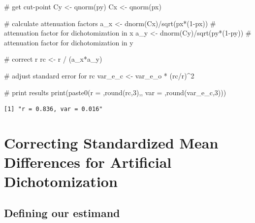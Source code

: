 \documentclass[
  letterpaper,
  DIV=11,
  numbers=noendperiod]{scrreprt}
\newenvironment{Shaded}{\begin{snugshade}}{\end{snugshade}}
\newcommand{\CommentTok}[1]{\textcolor[rgb]{0.37,0.37,0.37}{#1}}
\newcommand{\DecValTok}[1]{\textcolor[rgb]{0.68,0.00,0.00}{#1}}
\newcommand{\FunctionTok}[1]{\textcolor[rgb]{0.28,0.35,0.67}{#1}}
\newcommand{\NormalTok}[1]{\textcolor[rgb]{0.00,0.23,0.31}{#1}}
\newcommand{\OtherTok}[1]{\textcolor[rgb]{0.00,0.23,0.31}{#1}}
\newcommand{\SpecialCharTok}[1]{\textcolor[rgb]{0.37,0.37,0.37}{#1}}
\newcommand{\StringTok}[1]{\textcolor[rgb]{0.13,0.47,0.30}{#1}}
\begin{document}
\begin{Shaded}
\begin{Highlighting}[]
\CommentTok{\# get cut{-}point}
\NormalTok{Cy }\OtherTok{\textless{}{-}} \FunctionTok{qnorm}\NormalTok{(py)}
\NormalTok{Cx }\OtherTok{\textless{}{-}} \FunctionTok{qnorm}\NormalTok{(px)}

\CommentTok{\# calculate attenuation factors}
\NormalTok{a\_x }\OtherTok{\textless{}{-}} \FunctionTok{dnorm}\NormalTok{(Cx)}\SpecialCharTok{/}\FunctionTok{sqrt}\NormalTok{(px}\SpecialCharTok{*}\NormalTok{(}\DecValTok{1}\SpecialCharTok{{-}}\NormalTok{px)) }\CommentTok{\# attenuation factor for dichotomization in x}
\NormalTok{a\_y }\OtherTok{\textless{}{-}} \FunctionTok{dnorm}\NormalTok{(Cy)}\SpecialCharTok{/}\FunctionTok{sqrt}\NormalTok{(py}\SpecialCharTok{*}\NormalTok{(}\DecValTok{1}\SpecialCharTok{{-}}\NormalTok{py)) }\CommentTok{\# attenuation factor for dichotomization in y}

\CommentTok{\# correct r}
\NormalTok{rc }\OtherTok{\textless{}{-}}\NormalTok{ r }\SpecialCharTok{/}\NormalTok{ (a\_x}\SpecialCharTok{*}\NormalTok{a\_y)}

\CommentTok{\# adjust standard error for rc}
\NormalTok{var\_e\_c }\OtherTok{\textless{}{-}}\NormalTok{ var\_e\_o }\SpecialCharTok{*}\NormalTok{ (rc}\SpecialCharTok{/}\NormalTok{r)}\SpecialCharTok{\^{}}\DecValTok{2}

\CommentTok{\# print results}
\FunctionTok{print}\NormalTok{(}\FunctionTok{paste0}\NormalTok{(}\StringTok{\textquotesingle{}r = \textquotesingle{}}\NormalTok{,}\FunctionTok{round}\NormalTok{(rc,}\DecValTok{3}\NormalTok{),}\StringTok{\textquotesingle{}, var = \textquotesingle{}}\NormalTok{,}\FunctionTok{round}\NormalTok{(var\_e\_c,}\DecValTok{3}\NormalTok{)))}
\end{Highlighting}
\end{Shaded}

\begin{verbatim}
[1] "r = 0.836, var = 0.016"
\end{verbatim}

\hypertarget{correcting-standardized-mean-differences-for-artificial-dichotomization}{%
\section{Correcting Standardized Mean Differences for Artificial
Dichotomization}\label{correcting-standardized-mean-differences-for-artificial-dichotomization}}

\hypertarget{defining-our-estimand-1}{%
\subsection{Defining our estimand}\label{defining-our-estimand-1}}
\end{document}
